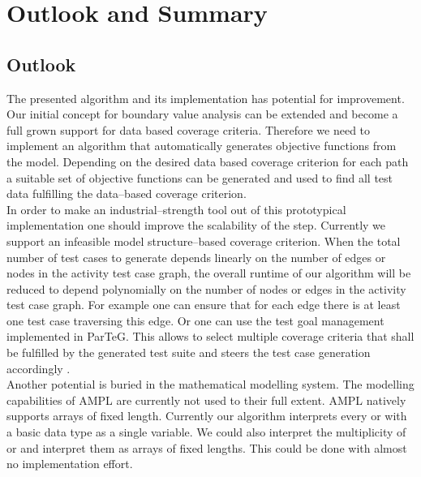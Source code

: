 \chapter{Outlook and Summary}
\section{Outlook}
The presented algorithm and its implementation has potential for improvement.
Our initial concept for boundary value analysis can be extended and become a full grown support for data based coverage criteria. Therefore we need to implement an algorithm that automatically generates objective functions from the model. Depending on the desired data based coverage criterion for each path a suitable set of objective functions can be generated and used to find all test data fulfilling the data--based coverage criterion.\\
In order to make an industrial--strength tool out of this prototypical implementation one should improve the scalability of the  step. Currently we support an infeasible model structure--based coverage criterion. %
When the total number of test cases to generate depends linearly on the number of edges or nodes in the activity test case graph, the overall runtime of our algorithm will be reduced to depend polynomially on the number of nodes or edges in the activity test case graph. For example one can ensure that for each edge there is at least one test case traversing this edge. Or one can use the test goal management implemented in ParTeG. This allows to select multiple coverage criteria that shall be fulfilled by the generated test suite and steers the test case generation accordingly \cite{weissleder2010parteg}.\\
Another potential is buried in the mathematical modelling system. The modelling capabilities of AMPL are currently not used to their full extent. AMPL natively supports arrays of fixed length. Currently our algorithm interprets every  or  with a basic data type as a single variable. We could also interpret the multiplicity of  or  and interpret them as arrays of fixed lengths. This could be done with almost no implementation effort.\\
